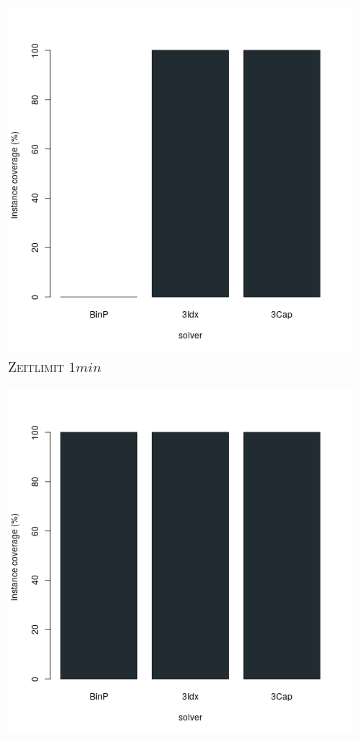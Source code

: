 \begin{figure}[H]
\centering

\begin{subfigure}[b]{0.3\textwidth}
\centering
\includegraphics[width=1.1\textwidth]{img/solver_instance_coverage_b=3_m_60s.png}
\caption{\textsc{Zeitlimit} $1min$}
\label{fig:instance_coverage_b=3_m_a}
\end{subfigure}
\hfill
\begin{subfigure}[b]{0.3\textwidth}
\centering
\includegraphics[width=1.1\textwidth]{img/solver_instance_coverage_b=3_m_120s.png}

\end{subfigure}
\end{figure}
